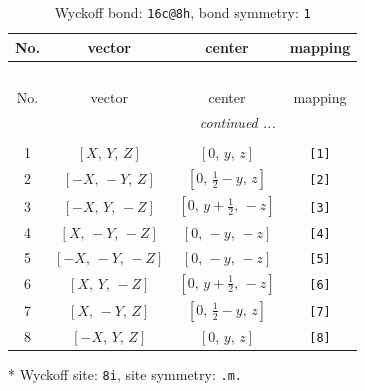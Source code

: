 \documentclass[fleqn,8pt]{jsarticle}
\begin{document}
\renewcommand{\arraystretch}{1.2}
\begin{longtable}{cccc}
\caption{Wyckoff bond: {\tt 16c@8h}, bond symmetry: {\tt 1}}
 \\
 \hline \hline
No. & vector & center & mapping \\ \hline \endfirsthead

\multicolumn{3}{l}{\tablename\ \thetable{}} \\
 \hline \hline
No. & vector & center & mapping \\ \hline \endhead

 \hline \hline
\multicolumn{3}{r}{\footnotesize\it continued ...} \\ \endfoot

 \hline \hline
\multicolumn{3}{r}{} \\ \endlastfoot

1 & $\left[ X,\, Y,\, Z \right]$ & $\left[ 0,\, y,\, z \right]$ & {\tt [1]} \\ \hline
2 & $\left[ - X,\, - Y,\, Z \right]$ & $\left[ 0,\, \frac{1}{2} - y,\, z \right]$ & {\tt [2]} \\ \hline
3 & $\left[ - X,\, Y,\, - Z \right]$ & $\left[ 0,\, y + \frac{1}{2},\, - z \right]$ & {\tt [3]} \\ \hline
4 & $\left[ X,\, - Y,\, - Z \right]$ & $\left[ 0,\, - y,\, - z \right]$ & {\tt [4]} \\ \hline
5 & $\left[ - X,\, - Y,\, - Z \right]$ & $\left[ 0,\, - y,\, - z \right]$ & {\tt [5]} \\ \hline
6 & $\left[ X,\, Y,\, - Z \right]$ & $\left[ 0,\, y + \frac{1}{2},\, - z \right]$ & {\tt [6]} \\ \hline
7 & $\left[ X,\, - Y,\, Z \right]$ & $\left[ 0,\, \frac{1}{2} - y,\, z \right]$ & {\tt [7]} \\ \hline
8 & $\left[ - X,\, Y,\, Z \right]$ & $\left[ 0,\, y,\, z \right]$ & {\tt [8]} \\
\end{longtable}
* Wyckoff site: {\tt 8i}, site symmetry: {\tt .m.}
\renewcommand{\arraystretch}{1.2}
\end{document}
